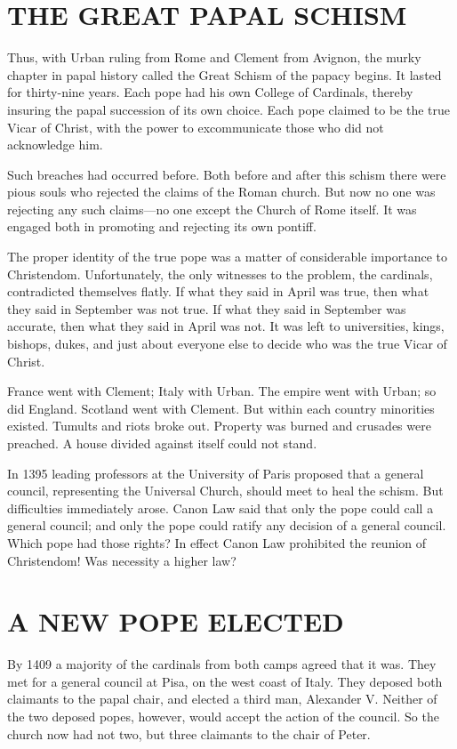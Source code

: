 \section{THE GREAT PAPAL SCHISM}

Thus, with Urban ruling from Rome and Clement from Avignon, the murky chapter in papal history
called the Great Schism of the papacy begins. It lasted for thirty-nine years. Each pope had his own
College of Cardinals, thereby insuring the papal succession of its own choice. Each pope claimed to
be the true Vicar of Christ, with the power to excommunicate those who did not acknowledge him.

Such breaches had occurred before. Both before and after this schism there were pious souls who
rejected the claims of the Roman church. But now no one was rejecting any such claims—no one except
the Church of Rome itself. It was engaged both in promoting and rejecting its own pontiff.

The proper identity of the true pope was a matter of considerable importance to Christendom.
Unfortunately, the only witnesses to the problem, the cardinals, contradicted themselves flatly. If
what they said in April was true, then what they said in September was not true. If what they said
in September was accurate, then what they said in April was not. It was left to universities, kings,
bishops, dukes, and just about everyone else to decide who was the true Vicar of Christ.

France went with Clement; Italy with Urban. The empire went with Urban; so did England. Scotland
went with Clement. But within each country minorities existed. Tumults and riots broke out. Property
was burned and crusades were preached. A house divided against itself could not stand.

In 1395 leading professors at the University of Paris proposed that a general council, representing
the Universal Church, should meet to heal the schism. But difficulties immediately arose. Canon Law
said that only the pope could call a general council; and only the pope could ratify any decision of
a general council. Which pope had those rights? In effect Canon Law prohibited the reunion of
Christendom! Was necessity a higher law?

\section{A NEW POPE ELECTED}

By 1409 a majority of the cardinals from both camps agreed that it was. They met for a general
council at Pisa, on the west coast of Italy. They deposed both claimants to the papal chair, and
elected a third man, Alexander V. Neither of the two deposed popes, however, would accept the action
of the council. So the church now had not two, but three claimants to the chair of Peter.


